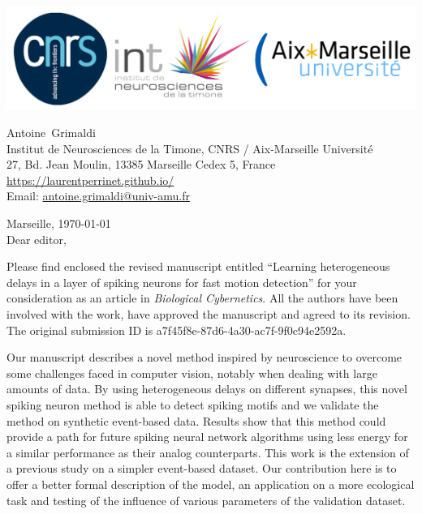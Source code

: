 \documentclass[10pt,english]{article}
\makeatletter
\newcommand{\LastName}{Grimaldi}%
\newcommand{\FirstName}{Antoine}%
\newcommand{\Institute}{Institut de Neurosciences de la Timone, CNRS / Aix-Marseille Universit\'e}%
\newcommand{\Address}{27, Bd. Jean Moulin, 13385 Marseille Cedex 5, France}%
\newcommand{\Website}{\url{https://laurentperrinet.github.io/}}%
\newcommand{\Email}{\url{antoine.grimaldi@univ-amu.fr}}%
\makeatother
\begin{document}
\includegraphics[width=.4\textwidth]{troislogos.png}
\\
\vspace{.1\baselineskip}
\hrulefill
\vspace{.1\baselineskip}

\begin{flushright}
	\FirstName\  \LastName\  \\
	\Institute\\[6pt]
	\Address\\%
	\Website \\
	  Email: \Email \\[6pt]
\end{flushright}
\justifying
\vspace{1\baselineskip}
Marseille, 
\today
\\[12pt] %
	
Dear editor,

Please find enclosed the revised manuscript entitled ``Learning heterogeneous delays in a layer of spiking neurons for fast motion detection'' for your consideration as an article in \emph{Biological Cybernetics}. All the authors have been involved with the work, have approved the manuscript and agreed to its revision. The original submission ID is a7f45f8e-87d6-4a30-ac7f-9f0c94e2592a. 

Our manuscript describes a novel method inspired by neuroscience to overcome some challenges faced in computer vision, notably when dealing with large amounts of data. By using heterogeneous delays on different synapses, this novel spiking neuron method is able to detect spiking motifs and we validate the method on synthetic event-based data. Results show that this method could provide a path for future spiking neural network algorithms using less energy for a similar performance as their analog counterparts. This work is the extension of a previous study on a simpler event-based dataset. Our contribution here is to offer a better formal description of the model, an application on a more ecological task and testing of the influence of various parameters of the validation dataset.
\end{document}
